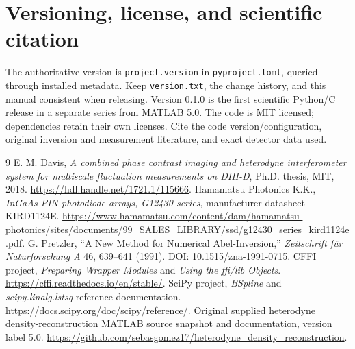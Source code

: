 \documentclass[11pt,letterpaper]{article}
\newcommand{\code}[1]{\nolinkurl{#1}}
\begin{document}
\section{Versioning, license, and scientific citation}
The authoritative version is \code{project.version} in \code{pyproject.toml},
queried through installed metadata. Keep \code{version.txt}, the change history,
and this manual consistent when releasing. Version 0.1.0 is the first scientific
Python/C release in a separate series from MATLAB 5.0. The code is MIT licensed;
dependencies retain their own licenses. Cite the code version/configuration,
original inversion and measurement literature, and exact detector data used.

\clearpage
\begin{thebibliography}{9}
 E. M. Davis, \emph{A combined phase contrast imaging and heterodyne interferometer system for multiscale fluctuation measurements on DIII-D}, Ph.D. thesis, MIT, 2018. \url{https://hdl.handle.net/1721.1/115666}.
 Hamamatsu Photonics K.K., \emph{InGaAs PIN photodiode arrays, G12430 series}, manufacturer datasheet KIRD1124E. \url{https://www.hamamatsu.com/content/dam/hamamatsu-photonics/sites/documents/99_SALES_LIBRARY/ssd/g12430_series_kird1124e.pdf}.
 G. Pretzler, ``A New Method for Numerical Abel-Inversion,'' \emph{Zeitschrift f\"ur Naturforschung A} 46, 639--641 (1991). DOI: 10.1515/zna-1991-0715.
 CFFI project, \emph{Preparing Wrapper Modules} and \emph{Using the ffi/lib Objects}. \url{https://cffi.readthedocs.io/en/stable/}.
 SciPy project, \emph{BSpline} and \emph{scipy.linalg.lstsq} reference documentation. \url{https://docs.scipy.org/doc/scipy/reference/}.
 Original supplied heterodyne density-reconstruction MATLAB source snapshot and documentation, version label 5.0. \url{https://github.com/sebasgomez17/heterodyne_density_reconstruction}.
\end{thebibliography}
\end{document}
